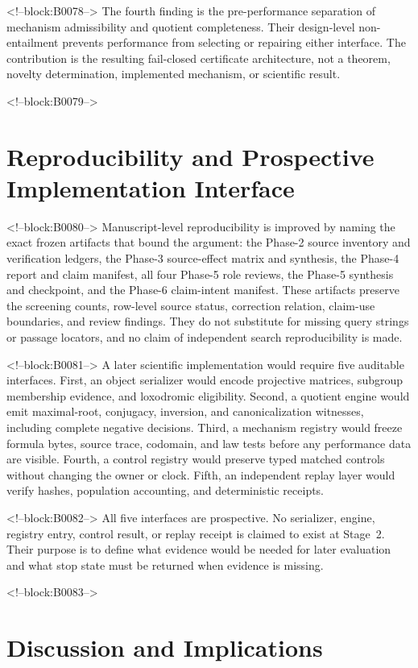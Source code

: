 \documentclass[11pt,a4paper]{article}
\begin{document}
<!--block:B0078-->
The fourth finding is the pre-performance separation of mechanism admissibility and quotient completeness. Their design-level non-entailment prevents performance from selecting or repairing either interface. The contribution is the resulting fail-closed certificate architecture, not a theorem, novelty determination, implemented mechanism, or scientific result.

<!--block:B0079-->
\section{Reproducibility and Prospective Implementation Interface}

<!--block:B0080-->
Manuscript-level reproducibility is improved by naming the exact frozen artifacts that bound the argument: the Phase-2 source inventory and verification ledgers, the Phase-3 source-effect matrix and synthesis, the Phase-4 report and claim manifest, all four Phase-5 role reviews, the Phase-5 synthesis and checkpoint, and the Phase-6 claim-intent manifest. These artifacts preserve the screening counts, row-level source status, correction relation, claim-use boundaries, and review findings. They do not substitute for missing query strings or passage locators, and no claim of independent search reproducibility is made.

<!--block:B0081-->
A later scientific implementation would require five auditable interfaces. First, an object serializer would encode projective matrices, subgroup membership evidence, and loxodromic eligibility. Second, a quotient engine would emit maximal-root, conjugacy, inversion, and canonicalization witnesses, including complete negative decisions. Third, a mechanism registry would freeze formula bytes, source trace, codomain, and law tests before any performance data are visible. Fourth, a control registry would preserve typed matched controls without changing the owner or clock. Fifth, an independent replay layer would verify hashes, population accounting, and deterministic receipts.

<!--block:B0082-->
All five interfaces are prospective. No serializer, engine, registry entry, control result, or replay receipt is claimed to exist at Stage~2. Their purpose is to define what evidence would be needed for later evaluation and what stop state must be returned when evidence is missing.

<!--block:B0083-->
\section{Discussion and Implications}
\end{document}
